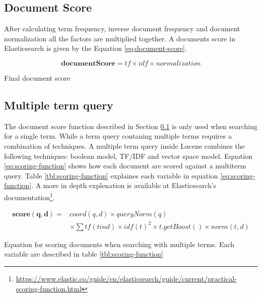 \subsection{Document Score}
\label{sec:doc-score}
After calculating term frequency, inverse document frequency and document normalization all the factors are multiplied together.
A documents score in Elasticsearch is given by the Equation \ref{eq:document-score}.

\begin{cequation}[H]
	\begin{equation}
		\mathbf{documentScore} = tf \times idf \times normalization
	\end{equation}
	\caption{Final document score}
  \label{eq:document-score}
\end{cequation}

\subsection{Multiple term query}
The document score function described in Section \ref{sec:doc-score} is only used when searching for a single term.
While a term query contaning multiple terms requires a combination of techniques.
A multiple term query inside Lucene combines the following techniques:
boolean model, TF/IDF and vector space model.
Equation \ref{eq:scoring-function} shows how each document are scored against a multiterm query.
Table \ref{tbl:scoring-function} explaines each variable in equation \ref{eq:scoring-function}.
A more in depth explenation is available at Elasticsearch's documentation\footnote{\url{https://www.elastic.co/guide/en/elasticsearch/guide/current/practical-scoring-function.html}}.

\begin{cequation}
	\begin{equation}
		\begin{aligned}
			\mathbf{score(q,d)} = & coord(q,d) \times queryNorm(q) \\
														& \times \sum tf(t in d) \times idf(t)^2 \times t.getBoost() \times norm(t,d)
		\end{aligned}
	\end{equation}
	\caption{Equation for scoring documents when searching with multiple terms. Each variable are described in table \ref{tbl:scoring-function}}
  \label{eq:scoring-function}
\end{cequation}

